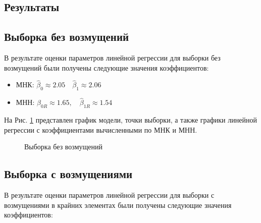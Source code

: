 \documentclass[12pt]{article}
\begin{document}
\begin{flushleft}
\newpage

\section{Результаты}

	\subsection{Выборка без возмущений}

	В результате оценки параметров линейной регрессии для выборки без возмущений были получены следующие значения коэффициентов:

	\begin{itemize}
		\item МНК: $\hat{\beta}_0 \approx 2.05 \quad \hat{\beta}_1 \approx 2.06$
		\item МНН: $\hat{\beta}_{0R} \approx 1.65, \quad \hat{\beta}_{1R} \approx 1.54$
	\end{itemize}

	На Рис. \ref{reg1} представлен график модели, точки выборки, а также графики линейной регрессии с коэффициентами вычисленными по МНК и МНН.

	\begin{figure}[h]
		\caption{Выборка без возмущений}
		\label{reg1}
	\end{figure}

	\newpage

	\subsection{Выборка с возмущениями}

	В результате оценки параметров линейной регрессии для выборки с возмущениями в крайних элементах были получены следующие значения коэффициентов:


\end{flushleft}
\end{document}
